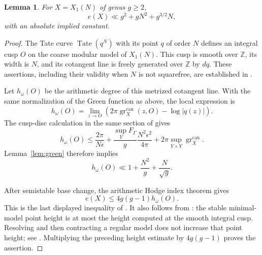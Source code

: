 \documentclass[11pt,a4paper]{article}
\newtheorem{lemma}[theorem]{Lemma}
\theoremstyle{definition}
\newcommand{\Z}{\mathbb Z}
\newcommand{\gr}{\operatorname{gr}^{\mathrm{can}}}
\begin{document}
\begin{lemma}\label{lem:self-intersection}
For $X=X_1(N)$ of genus $g\ge2$,
\[
 e(X)\ll g^2+gN^2+g^{3/2}N,
\]
with an absolute implied constant.
\end{lemma}
\begin{proof}
The Tate curve $\operatorname{Tate}(q^N)$ with its point $q$ of
order $N$ defines an integral cusp $O$ on the coarse modular model
of $X_1(N)$. This cusp is smooth over $\Z$, its width is $N$,
and its cotangent line is freely generated over $\Z$ by $dq$.
These assertions, including their validity when $N$ is not
squarefree, are established in \cite[Chapter~III, Section~5.1,
pp.~96--97]{BruinThesis}.

Let $h_\omega(O)$ be the arithmetic degree of this metrized
cotangent line. With the same normalization of the Green function
as above, the local expression is
\[
 h_\omega(O)=\lim_{z\to O}
 \left(2\pi\gr_X(z,O)-\log|q(z)|\right).
\]
The cusp-disc calculation in the same section of
\cite{BruinThesis} gives
\begin{equation}\label{eq:cusp-height}
 h_\omega(O)\le
 \frac{2\pi}{N\epsilon}
 +\frac{\sup_YF_\Gamma}{g}\frac{N^2\epsilon^2}{4\pi}
 +2\pi\sup_{Y\times Y}\gr_X.
\end{equation}
Lemma~\ref{lem:green} therefore implies
\[
 h_\omega(O)\ll1+\frac{N^2}{g}+\frac{N}{\sqrt g}.
\]

After semistable base change, the arithmetic Hodge index theorem
gives
\[
 e(X)\le4g(g-1)h_\omega(O).
\]
This is the last displayed inequality of
\cite[Chapter~III, Section~5.1, p.~97]{BruinThesis}.
It also follows from \cite[Theorem~2.4.1]{Javanpeykar}:
the stable minimal-model point height is at most the height
computed at the smooth integral cusp. Resolving and then
contracting a regular model does not increase that point height;
see \cite[Lemma~2.3.1]{Javanpeykar}.
Multiplying the preceding height estimate by $4g(g-1)$ proves
the assertion.
\end{proof}
\end{document}
